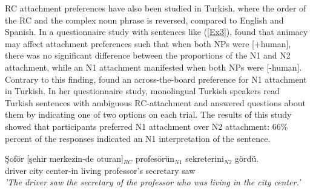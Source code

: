 \documentclass[11pt]{article}\usepackage[]{graphicx}\usepackage[]{color}
\begin{document}

RC attachment preferences have also been studied in Turkish, where the order of the RC and the complex noun phrase is reversed, compared to English and Spanish. In a questionnaire study with sentences like (\ref{Ex3}), \citet{Kirkici:2004} found that animacy may affect attachment preferences such that when both NPs were [+human], there was no significant difference between the proportions of the N1 and N2 attachment, while an N1 attachment manifested when both NPs were [-human]. Contrary to this finding, \citet{Dinctopal-Deniz:2010} found an across-the-board preference for N1 attachment in Turkish. In her questionnaire study, monolingual Turkish speakers read Turkish sentences with ambiguous RC-attachment and answered questions about them by indicating one of two options on each trial. The results of this study showed that participants preferred N1 attachment over N2 attachment: $66\%$ percent of the responses indicated an N1 interpretation of the sentence.

\begin{exe}
\ex \label{Ex3} \gll Şoför [şehir merkezin-de     oturan]$_{RC}$ profesörün$_{N1}$ sekreterini$_{N2}$ gördü. \\
                     driver {city} center-in living  professor's secretary saw \\
                    \textit{'The driver saw the secretary of the professor who was living in the city center.'}
\end{exe}
\end{document}
